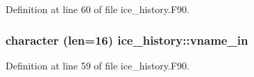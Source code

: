 Definition at line 60 of file ice\_\-history.F90.\hypertarget{namespaceice__history_a795d9a5379207bc00848c3d58be6fac2}{
\subsubsection[{vname\_\-in}]{\setlength{\rightskip}{0pt plus 5cm}character (len=16) {\bf ice\_\-history::vname\_\-in}}}
\label{namespaceice__history_a795d9a5379207bc00848c3d58be6fac2}


Definition at line 59 of file ice\_\-history.F90.